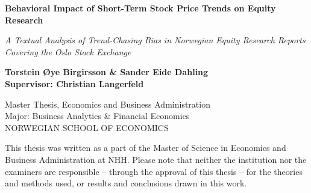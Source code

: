 
\begin{titlepage}
	
	
	\thispagestyle{frontpage}
	
	\begin{center}
		
		\vspace*{5\baselineskip}
	
		
		{\Huge \textbf{Behavioral Impact of Short-Term Stock Price Trends on Equity Research\\}}
		
		\large{\textit{A Textual Analysis of Trend-Chasing Bias in Norwegian Equity Research Reports Covering the Oslo Stock Exchange}}\\
		
        \vspace*{1,5\baselineskip}

		\large{\textbf{Torstein Øye Birgirsson \& Sander Eide Dahling}}\\
		\large{\textbf{Supervisor: Christian Langerfeld}}\\
		
		\vspace{1,5\baselineskip}
		
		\large{Master Thesis, Economics and Business
Administration}\\
		\large{Major: Business Analytics \& Financial Economics}\\
		
		\vspace{1,5\baselineskip}
		\large{NORWEGIAN SCHOOL OF ECONOMICS}\\

	\end{center}
	
	\vspace*{3\baselineskip}
	{This thesis was written as a part of the Master of Science in Economics and Business Administration at NHH. Please note that neither the institution nor the examiners are
responsible – through the approval of this thesis – for the theories and methods used, or
results and conclusions drawn in this work.}
	
\end{titlepage}





